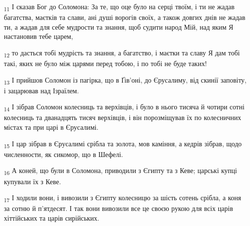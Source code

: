 \begin{tcolorbox}
\textsubscript{11} І сказав Бог до Соломона: За те, що оце було на серці твоїм, і ти не жадав багатства, маєтків та слави, ані душі ворогів своїх, а також довгих днів не жадав ти, а жадав для себе мудрости та знання, щоб судити народ Мій, над яким Я настановив тебе царем,
\end{tcolorbox}
\begin{tcolorbox}
\textsubscript{12} то дасться тобі мудрість та знання, а багатство, і маєтки та славу Я дам тобі такі, яких не було між царями перед тобою, і по тобі не буде таких!
\end{tcolorbox}
\begin{tcolorbox}
\textsubscript{13} І прийшов Соломон із пагірка, що в Ґів'оні, до Єрусалиму, від скинії заповіту, і зацарював над Ізраїлем.
\end{tcolorbox}
\begin{tcolorbox}
\textsubscript{14} І зібрав Соломон колесниць та верхівців, і було в нього тисяча й чотири сотні колесниць та дванадцять тисяч верхівців, і він порозміщував їх по колесничних містах та при царі в Єрусалимі.
\end{tcolorbox}
\begin{tcolorbox}
\textsubscript{15} І цар зібрав в Єрусалимі срібла та золота, мов каміння, а кедрів зібрав, щодо численности, як сикомор, що в Шефелі.
\end{tcolorbox}
\begin{tcolorbox}
\textsubscript{16} А коней, що були в Соломона, приводили з Єгипту та з Кеве; царські купці купували їх з Кеве.
\end{tcolorbox}
\begin{tcolorbox}
\textsubscript{17} І ходили вони, і вивозили з Єгипту колесницю за шість сотень срібла, а коня за сотню й п'ятдесят. І так вони вивозили все це своєю рукою для всіх царів хіттійських та царів сирійських.
\end{tcolorbox}
